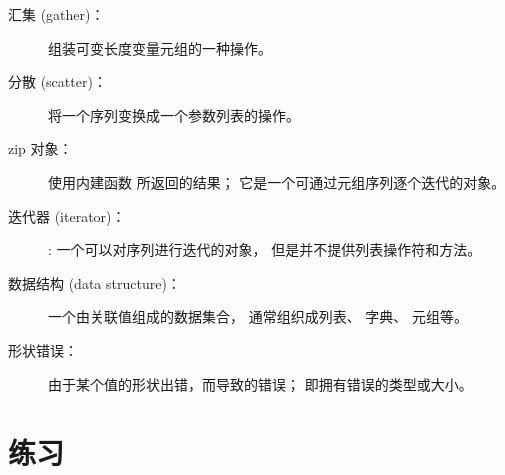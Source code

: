 {\begin{description}
\item[汇集 (gather)：] 组装可变长度变量元组的一种操作。


\item[分散 (scatter)：] 将一个序列变换成一个参数列表的操作。



\item[zip 对象：] 使用内建函数  所返回的结果； 它是一个可通过元组序列逐个迭代的对象。
 


\item[迭代器 (iterator)：]: 一个可以对序列进行迭代的对象， 但是并不提供列表操作符和方法。


\item[数据结构 (data structure)：] 一个由关联值组成的数据集合， 通常组织成列表、 字典、 元组等。


\item[形状错误：] 由于某个值的形状出错，而导致的错误； 即拥有错误的类型或大小。

\end{description}



\section{练习}

}
